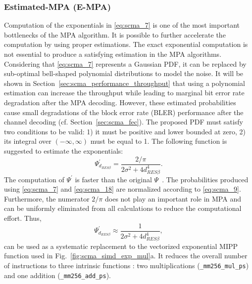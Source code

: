\subsubsection{Estimated-MPA (E-MPA)}

Computation of the exponentials in \eqref{eq:scma_7} is one of the most
important bottlenecks of the MPA algorithm. It is possible to further accelerate
the computation by using proper estimations. The exact exponential computation
is not essential to produce a satisfying estimation in the MPA algorithms.
Considering that \eqref{eq:scma_7} represents a Gaussian PDF, it can be replaced
by sub-optimal bell-shaped polynomial distributions to model the noise. It will
be shown in Section~\ref{sec:scma_performance_throughput} that using a
polynomial estimation can increase the throughput while leading to marginal bit
error rate degradation after the MPA decoding. However, these estimated
probabilities cause small degradations of the block error rate (BLER)
performance after the channel decoding (cf. Section~\ref{sec:scma_fec}). The
proposed PDF must satisfy two conditions to be valid: 1) it must be positive and
lower bounded at zero, 2) its integral over $(-\infty, \infty)$ must be equal to
1. The following function is suggested to estimate the exponentials:
\begin{equation}
  \label{eq:scma_18}
  \Psi^{'}_{d_{RES \beta}} = \frac{2 / \pi}{2\sigma^2 + 4d^4_{RES \beta}}.
\end{equation}
The computation of $\Psi^{'}$ is faster than the original
$\Psi$~\cite{Ghaffari2017}. The probabilities produced using \eqref{eq:scma_7}
and \eqref{eq:scma_18} are normalized according to \eqref{eq:scma_9}.
Furthermore, the numerator $2/\pi$ does not play an important role in MPA and
can be uniformly eliminated from all calculations to reduce the computational
effort. Thus,
\begin{equation}
  \label{eq:scma_19}
  \Psi^{'}_{d_{RES \beta}} \approx \frac{1}{2\sigma^2 + 4d^4_{RES \beta}},
\end{equation}
can be used as a systematic replacement to the vectorized exponential MIPP
function used in Fig.~\ref{fig:scma_simd_exp_mul}a. It reduces the overall
number of instructions to three intrinsic functions : two multiplications
(\verb|_mm256_mul_ps|) and one addition (\verb|_mm256_add_ps|).

